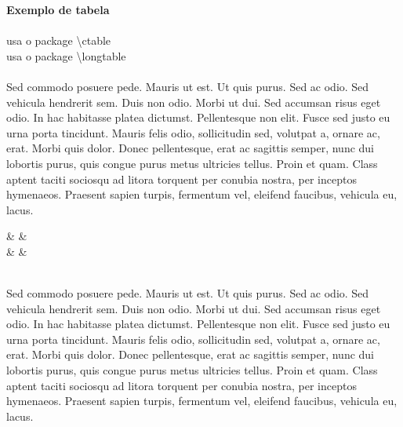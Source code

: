 \documentclass[12pt,a4paper]{article}
\begin{document}
\noindent{}\textbf{Exemplo de tabela}\\
\\ usa o package \textbackslash{ctable}
\\ usa o package \textbackslash{longtable}
\noindent\\
\noindent\\
Sed commodo posuere pede. Mauris ut est. Ut quis purus. Sed ac odio.
Sed vehicula hendrerit sem. Duis non odio. Morbi ut dui. Sed accumsan
risus eget odio. In hac habitasse platea dictumst. Pellentesque non elit.
Fusce sed justo eu urna porta tincidunt. Mauris felis odio, sollicitudin sed,
volutpat a, ornare ac, erat. Morbi quis dolor. Donec pellentesque, erat ac
sagittis semper, nunc dui lobortis purus, quis congue purus metus ultricies
tellus. Proin et quam. Class aptent taciti sociosqu ad litora torquent per
conubia nostra, per inceptos hymenaeos. Praesent sapien turpis, fermentum
vel, eleifend faucibus, vehicula eu, lacus.

\setlength\tabcolsep{0cm}

{}
{
	 &
	 & 
	\\\hline
	 &
	 & 
	\\\hline
	\\
}

Sed commodo posuere pede. Mauris ut est. Ut quis purus. Sed ac odio.
Sed vehicula hendrerit sem. Duis non odio. Morbi ut dui. Sed accumsan
risus eget odio. In hac habitasse platea dictumst. Pellentesque non elit.
Fusce sed justo eu urna porta tincidunt. Mauris felis odio, sollicitudin sed,
volutpat a, ornare ac, erat. Morbi quis dolor. Donec pellentesque, erat ac
sagittis semper, nunc dui lobortis purus, quis congue purus metus ultricies
tellus. Proin et quam. Class aptent taciti sociosqu ad litora torquent per
conubia nostra, per inceptos hymenaeos. Praesent sapien turpis, fermentum
vel, eleifend faucibus, vehicula eu, lacus.
\end{document}
